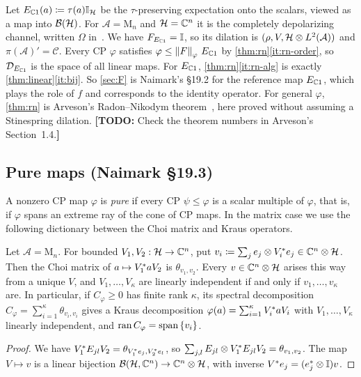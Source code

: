 \documentclass[12pt]{article}
\newcommand{\todo}[1]{\textcolor{\mysubcolor}{\small\textbf{[TODO:} #1\textbf{]}}}
\newcommand{\alg}{\mathcal{A}}             %
\newcommand{\hilb}{\mathcal{H}}            %
\newcommand{\bdd}[1]{\mathcal{B}\br{#1}}   %
\newcommand{\Mn}[1]{\mathrm{M}_{#1}}       %
\newcommand{\rankone}[2]{\theta_{#1, #2}}  %
\newcommand{\Ltwo}{L^2\br{\alg}}
\newcommand{\Ltn}{\hilb \tensor \Ltwo}
\newcommand{\Fphi}{F_{\varphi}}
\newcommand{\Choi}{C_{\varphi}}
\newcommand{\comm}{\mathcal{C}}            %
\newcommand{\Esc}{E_{\complex 1}}          %
\newcommand{\ran}{\operatorname{ran}}
\begin{document}
\begin{remark}
\label{rem:universal}
Let \(\Esc(a) \eqdef \tau(a)\id_{\hilb}\) be the \(\tau\)-preserving expectation
onto the scalars, viewed as a map into \(\bdd{\hilb}\). For \(\alg = \Mn{n}\) and
\(\hilb = \complex^n\) it is the completely depolarizing channel, written
\(\Omega\) in~\cite{Watrous2018}. We have \(F_{\Esc} = \id\), so its dilation is
\((\rho, V, \Ltn)\) and \(\pi(\alg)' = \comm\). Every CP \(\varphi\) satisfies
\(\varphi \le \norm\Fphi\,\Esc\) by \cref{thm:rn}\ref{it:rn-order}, so
\(\mathcal{D}_{\Esc}\) is the space of all linear maps. For \(\Esc\),
\cref{thm:rn}\ref{it:rn-alg} is exactly \cref{thm:linear}\ref{it:bij}. So
\cref{sec:F} is Naimark's \S19.2 for the reference map \(\Esc\), which plays the
role of \(f\) and corresponds to the identity operator. For general
\(\varphi\), \cref{thm:rn} is Arveson's Radon--Nikodym
theorem~\cite[Section~1.4]{Arveson1969}, here proved without assuming a
Stinespring dilation. \todo{Check the theorem numbers in Arveson's Section~1.4.}
\end{remark}

\subsection{Pure maps (Naimark \S19.3)}
\label{sec:pure}

A nonzero CP map \(\varphi\) is \emph{pure} if every CP \(\psi \le \varphi\) is a
scalar multiple of \(\varphi\), that is, if \(\varphi\) spans an extreme ray of the
cone of CP maps. In the matrix case we use the following dictionary between the
Choi matrix and Kraus operators.

\begin{lemma}
\label{lem:kraus}
Let \(\alg = \Mn n\). For bounded \(V_1, V_2 : \hilb \to \complex^n\), put
\(v_i \eqdef \sum_j e_j \tensor V_i^\adjoint e_j \in \complex^n \tensor \hilb\).
Then the Choi matrix of \(a \mapsto V_1^* a V_2\) is \(\rankone{v_1}{v_2}\).
Every \(v \in \complex^n \tensor \hilb\) arises this way from a unique \(V\),
and \(V_1, \dots, V_\kappa\) are linearly independent if and only if
\(v_1, \dots, v_\kappa\) are. In particular, if \(\Choi \ge 0\) has finite rank
\(\kappa\), its spectral decomposition \(\Choi = \sum_{i=1}^\kappa \rankone{v_i}{v_i}\)
gives a Kraus decomposition \(\varphi(a) = \sum_{i=1}^\kappa V_i^* a V_i\) with
\(V_1, \dots, V_\kappa\) linearly independent, and \(\ran\Choi = \Span\set{v_i}\).
\end{lemma}
\begin{proof}
We have \(V_1^\adjoint E_{jl}V_2 = \rankone{V_1^\adjoint e_j}{V_2^\adjoint e_l}\), so
\(\sum_{j,l} E_{jl} \tensor V_1^\adjoint E_{jl}V_2 = \rankone{v_1}{v_2}\). The map
\(V \mapsto v\) is a linear bijection \(\bdd{\hilb, \complex^n} \to
\complex^n \tensor \hilb\), with inverse \(V^* e_j = (e_j^* \otimes {\mathbb I})v\).
\end{proof}
\end{document}
